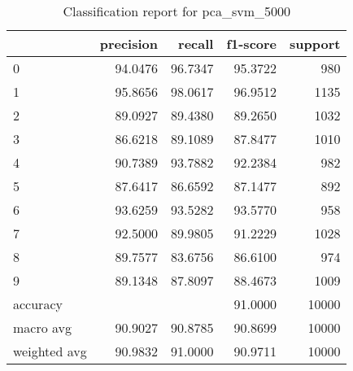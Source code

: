 \begin{table}[htb!]
\centering
\begin{tabular}{lrrrr}
    \toprule
 & precision & recall & f1-score & support \\
 \midrule
 0 & 94.0476 & 96.7347 & 95.3722 & 980 \\
 1 & 95.8656 & 98.0617 & 96.9512 & 1135 \\
 2 & 89.0927 & 89.4380 & 89.2650 & 1032 \\
 3 & 86.6218 & 89.1089 & 87.8477 & 1010 \\
 4 & 90.7389 & 93.7882 & 92.2384 & 982 \\
 5 & 87.6417 & 86.6592 & 87.1477 & 892 \\
 6 & 93.6259 & 93.5282 & 93.5770 & 958 \\
 7 & 92.5000 & 89.9805 & 91.2229 & 1028 \\
 8 & 89.7577 & 83.6756 & 86.6100 & 974 \\
 9 & 89.1348 & 87.8097 & 88.4673 & 1009 \\
 accuracy & & & 91.0000 & 10000 \\
 macro avg & 90.9027 & 90.8785 & 90.8699 & 10000 \\
 weighted avg & 90.9832 & 91.0000 & 90.9711 & 10000 \\
 \bottomrule
\end{tabular}
\caption{Classification report for pca_svm_5000}
\label{tab:classification-report-pca_svm_5000}
\end{table}
